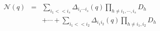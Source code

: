 \documentclass[10pt]{article}
\begin{document}
\begin{eqnarray}
\nonumber
\mathcal{N}(q)
&=&
\sum_{i_1 << i_s} \Delta_{i_1 \cdots i_s}(q) \prod_{h \neq i_1, \cdots, i_s} D_h \\
\nonumber
&&+ \cdots + \sum_{i_1 << i_2} \Delta_{i_1 i_2}(q) \prod_{h \neq i_1, i_2} D_h
\end{eqnarray}
\end{document}
